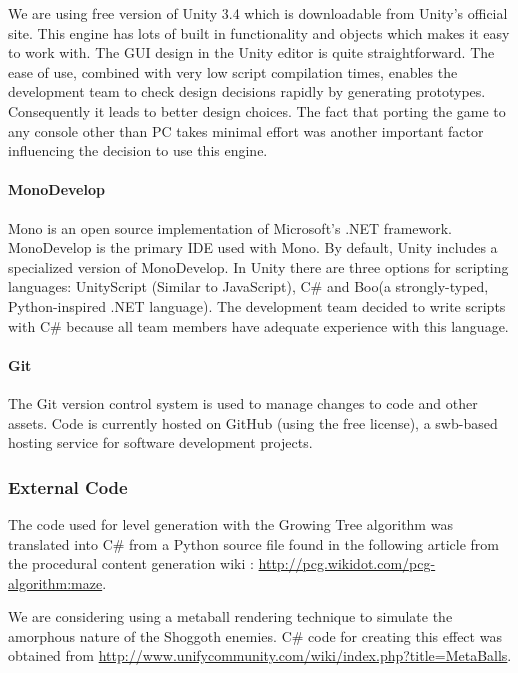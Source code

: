 \documentclass{article}
\begin{document}
We are using free version of Unity 3.4 which is downloadable from Unity's official site.  This engine has lots of built in functionality and objects which makes it easy to work with.  The GUI design in the Unity editor is quite straightforward.  The ease of use, combined with very low script compilation times, enables the development team to check design decisions rapidly by generating prototypes.  Consequently it leads to better design choices.  The fact that porting the game to any console other than PC takes minimal effort was another important factor influencing the decision to use this engine.

\paragraph{MonoDevelop}

Mono is an open source implementation of Microsoft's .NET framework.  MonoDevelop is the primary IDE used with Mono.  By default, Unity includes a specialized version of MonoDevelop.  In Unity there are three options for scripting languages: UnityScript (Similar to JavaScript), C\# and Boo(a strongly-typed, Python-inspired .NET language).  The development team decided to write scripts with C\# because all team members have adequate experience with this language.

\paragraph{Git}

The Git version control system is used to manage changes to code and other assets.  Code is currently hosted on GitHub (using the free license), a swb-based hosting service for software  development projects.

\subsubsection{External Code}

The code used for level generation with the Growing Tree algorithm was translated into C\# from a Python source file found in the following article from the procedural content generation wiki : \url{http://pcg.wikidot.com/pcg-algorithm:maze}.

We are considering using a metaball rendering technique to simulate the amorphous nature of the Shoggoth enemies.  C\# code for creating this effect was obtained from \url{http://www.unifycommunity.com/wiki/index.php?title=MetaBalls}.
\end{document}
